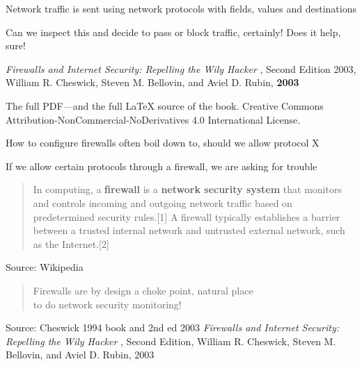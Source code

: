 \documentclass[Screen16to9,17pt]{foils}
\begin{document}



\begin{list2}
\item Network traffic is sent using network protocols with fields, values and destinations
\item Can we inspect this and decide to pass or block traffic, certainly! Does it help, sure!
\end{list2}




\begin{list2}
\item \emph{Firewalls and Internet Security: Repelling the Wily Hacker} , Second Edition 2003, William R. Cheswick, Steven M. Bellovin, and Aviel D. Rubin, {\bf 2003} 
\item The full PDF—and the full LaTeX source of the book.
Creative Commons Attribution-NonCommercial-NoDerivatives 4.0 International License.
\item How to configure firewalls often boil down to, should we allow protocol X
\item If we allow certain protocols through a firewall, we are asking for trouble
\end{list2}



\begin{quote}
In computing, a {\bf firewall} is a {\bf network security system} that monitors and controls incoming and outgoing network traffic based on predetermined security rules.[1] A firewall typically establishes a barrier between a trusted internal network and untrusted external network, such as the Internet.[2]
\end{quote}
Source: Wikipedia 

\begin{quote}
Firewalls are by design a choke point, natural place \\
to do network security monitoring!
\end{quote}

Source: Cheswick 1994 book and 2nd ed 2003
\emph{Firewalls and Internet Security: Repelling the Wily Hacker} , Second Edition, William R. Cheswick, Steven M. Bellovin, and Aviel D. Rubin, 2003
\end{document}
